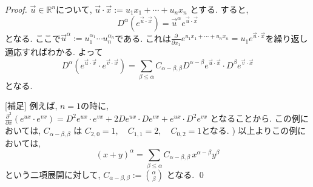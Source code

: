 \documentclass[dvipdfmx,a4paper,11pt]{article} %
\theoremstyle{definition}
\theoremstyle{remark}
\numberwithin{equation}{section}
\begin{document}
\begin{proof}
 \(\overrightarrow{u} \in \mathbb{R}^n\)について, 
 \(\overrightarrow{u} \cdot \overrightarrow{x} := u_1 x_1 + \cdots + u_n x_n\) とする.
 すると, 
\[
D^\alpha \left( e^{\overrightarrow{u} \cdot \overrightarrow{x}} \right) = \overrightarrow{u}^\alpha e^{\overrightarrow{u} \cdot \overrightarrow{x}}
\]
となる. ここで$\overrightarrow{u}^{\alpha}:=u_{1}^{\alpha_1} \cdots u_{n}^{\alpha_n}$である. 
これは\( \frac{\partial}{\partial x_1} e^{u_1 x_1 + \cdots + u_n x_n} = u_1 e^{\overrightarrow{u} \cdot \overrightarrow{x}}\)を繰り返し適応すればわかる. 
よって
\[
D^\alpha(e^{\overrightarrow{u} \cdot \overrightarrow{x}} \cdot e^{\overrightarrow{v} \cdot \overrightarrow{x}}) = 
\sum_{\beta \le \alpha} C_{\alpha-\beta,\beta} D^{\alpha-\beta} e^{\overrightarrow{u} \cdot \overrightarrow{x}} \cdot D^\beta e^{\overrightarrow{v} \cdot \overrightarrow{x}}
\]
となる. 

[補足] 例えば, $n=1$の時に, \(\frac{\partial^2}{\partial x} \left( e^{u x} \cdot e^{v x} \right)
= D^2 e^{u x} \cdot e^{v x} + 2 D e^{u x} \cdot D e^{v x} + e^{ux} \cdot D^2 e^{v x}
\)
となることから. この例においては, \(C_{\alpha-\beta,\beta}\) は
\(C_{2,0} = 1, \quad C_{1,1} = 2, \quad C_{0,2} = 1\)となる. )
以上よりこの例においては, 
\[
(x+y)^\alpha = \sum_{\beta \le \alpha} C_{\alpha-\beta,\beta} \, x^{\alpha-\beta} y^\beta
\]
という二項展開に対して,  \(C_{\alpha-\beta,\beta} := \binom{\alpha}{\beta}\) となる. \qed


\end{proof}
\end{document}
